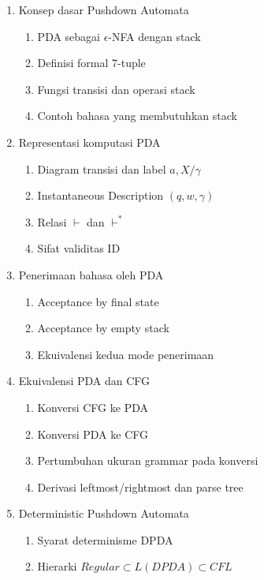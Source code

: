 \begin{enumerate}
    \item \pwajib Konsep dasar Pushdown Automata
    \begin{enumerate}
        \item \pwajib PDA sebagai $\epsilon$-NFA dengan stack
        \item \pwajib Definisi formal 7-tuple
        \item \pwajib Fungsi transisi dan operasi stack
        \item \ppaham Contoh bahasa yang membutuhkan stack
    \end{enumerate}
    \item \pwajib Representasi komputasi PDA
    \begin{enumerate}
        \item \pwajib Diagram transisi dan label $a,X/\gamma$
        \item \pwajib Instantaneous Description $(q,w,\gamma)$
        \item \pwajib Relasi $\vdash$ dan $\vdash^*$
        \item \ppaham Sifat validitas ID
    \end{enumerate}
    \item \pwajib Penerimaan bahasa oleh PDA
    \begin{enumerate}
        \item \pwajib Acceptance by final state
        \item \pwajib Acceptance by empty stack
        \item \pwajib Ekuivalensi kedua mode penerimaan
    \end{enumerate}
    \item \pwajib Ekuivalensi PDA dan CFG
    \begin{enumerate}
        \item \pwajib Konversi CFG ke PDA
        \item \pwajib Konversi PDA ke CFG
        \item \ppaham Pertumbuhan ukuran grammar pada konversi
        \item \pwajib Derivasi leftmost/rightmost dan parse tree
    \end{enumerate}
    \item \ppaham Deterministic Pushdown Automata
    \begin{enumerate}
        \item \ppaham Syarat determinisme DPDA
        \item \ppaham Hierarki $Regular \subset L(DPDA) \subset CFL$

\end{enumerate}
\end{enumerate}
